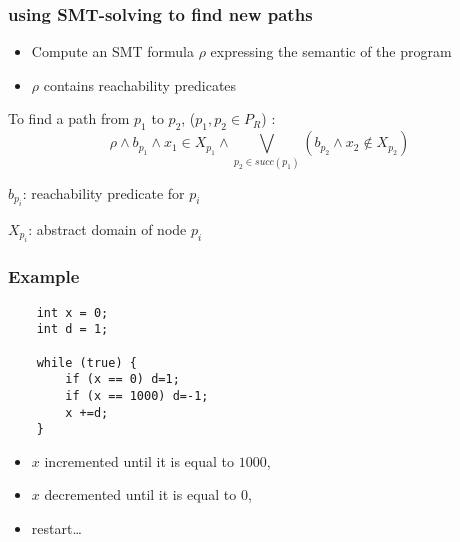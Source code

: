 \documentclass{beamer}
\begin{document}
\begin{frame}
  \frametitle{using SMT-solving to find new paths}
\begin{itemize}
\item Compute an SMT formula $\rho$ expressing the semantic of the program
\item $\rho$ contains reachability predicates
\end{itemize}
\bigskip
To find a path from $p_1$ to $p_2$, ($p_1,p_2 \in P_R$) :
$$\rho  \wedge b_{p_1} \wedge x_1 \in X_{p_1} \wedge \bigvee_{p_2 \in succ(p_1)}
 (b_{p_2} \wedge x_2 \notin X_{p_2})$$

\footnotesize{
$b_{p_i}$: reachability predicate for $p_i$

$X_{p_i}$: abstract domain of node $p_i$
}
\end{frame}

\begin{frame}[containsverbatim]
	\frametitle{Example}
\begin{center}
\begin{lstlisting}
	int x = 0;
	int d = 1;
	
	while (true) {
		if (x == 0) d=1;
		if (x == 1000) d=-1;
		x +=d;
	}
\end{lstlisting}
\end{center}
\begin{itemize}
\item $x$ incremented until it is equal to $1000$,
\item $x$ decremented until it is equal to $0$,
\item restart\ldots
\end{itemize}

\end{frame}
\end{document}
